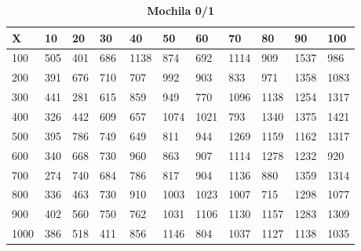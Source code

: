 \documentclass[10pt,letterpaper]{article}
\begin{document}
\newpage 
{}
\begin{center}
\begin{table}\renewcommand{\arraystretch}{2.5}
\caption{\large \textbf{Mochila 0/1}}
\centering
\begin{tabular} { |m{0.5cm}|m{1.3cm}|m{1.3cm}|m{1.3cm}|m{1.3cm}|m{1.3cm}|m{1.3cm}|m{1.3cm}|m{1.3cm}|m{1.3cm}|m{1.3cm}|} 
\hline
\rowcolor{Gray}
\centering \textbf{X} & \centering \textbf{10} & \centering \textbf{20} & \centering \textbf{30}\ & \centering \textbf{40} & \centering \textbf{50} & \centering \textbf{60}\ & \centering \textbf{70} & \centering \textbf{80} & \centering \textbf{90}\ & \textbf{100} \\\hline
\cellcolor{Gray}100 & \Large 505 & \Large 401 & \Large 686 & \Large 1138 & \Large 874 & \Large 692 & \Large 1114 & \Large 909 & \Large 1537 & \Large 986 \\
\hline
\cellcolor{Gray}200 & \Large 391 & \Large 676 & \Large 710 & \Large 707 & \Large 992 & \Large 903 & \Large 833 & \Large 971 & \Large 1358 & \Large 1083 \\
\hline
\cellcolor{Gray}300 & \Large 441 & \Large 281 & \Large 615 & \Large 859 & \Large 949 & \Large 770 & \Large 1096 & \Large 1138 & \Large 1254 & \Large 1317 \\
\hline
\cellcolor{Gray}400 & \Large 326 & \Large 442 & \Large 609 & \Large 657 & \Large 1074 & \Large 1021 & \Large 793 & \Large 1340 & \Large 1375 & \Large 1421 \\
\hline
\cellcolor{Gray}500 & \Large 395 & \Large 786 & \Large 749 & \Large 649 & \Large 811 & \Large 944 & \Large 1269 & \Large 1159 & \Large 1162 & \Large 1317 \\
\hline
\cellcolor{Gray}600 & \Large 340 & \Large 668 & \Large 730 & \Large 960 & \Large 863 & \Large 907 & \Large 1114 & \Large 1278 & \Large 1232 & \Large 920 \\
\hline
\cellcolor{Gray}700 & \Large 274 & \Large 740 & \Large 684 & \Large 786 & \Large 817 & \Large 904 & \Large 1136 & \Large 880 & \Large 1359 & \Large 1314 \\
\hline
\cellcolor{Gray}800 & \Large 336 & \Large 463 & \Large 730 & \Large 910 & \Large 1003 & \Large 1023 & \Large 1007 & \Large 715 & \Large 1298 & \Large 1077 \\
\hline
\cellcolor{Gray}900 & \Large 402 & \Large 560 & \Large 750 & \Large 762 & \Large 1031 & \Large 1106 & \Large 1130 & \Large 1157 & \Large 1283 & \Large 1309 \\
\hline
\cellcolor{Gray}1000 & \Large 386 & \Large 518 & \Large 411 & \Large 856 & \Large 1146 & \Large 804 & \Large 1037 & \Large 1127 & \Large 1138 & \Large 1035 \\
\hline
\end{tabular} \\
\end{table}
\end{center}
\end{document}
